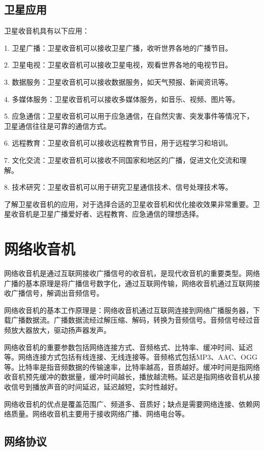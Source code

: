 \documentclass[12pt,UTF8]{ctexbook}
\begin{document}
\subsection{卫星应用}

卫星收音机具有以下应用：

1. 卫星广播：卫星收音机可以接收卫星广播，收听世界各地的广播节目。

2. 卫星电视：卫星收音机可以接收卫星电视，观看世界各地的电视节目。

3. 数据服务：卫星收音机可以接收数据服务，如天气预报、新闻资讯等。

4. 多媒体服务：卫星收音机可以接收多媒体服务，如音乐、视频、图片等。

5. 应急通信：卫星收音机可以用于应急通信，在自然灾害、突发事件等情况下，卫星通信往往是可靠的通信方式。

6. 远程教育：卫星收音机可以接收远程教育节目，用于远程学习和培训。

7. 文化交流：卫星收音机可以接收不同国家和地区的广播，促进文化交流和理解。

8. 技术研究：卫星收音机可以用于研究卫星通信技术、信号处理技术等。

了解卫星收音机的应用，对于选择合适的卫星收音机和优化接收效果非常重要。卫星收音机是卫星广播爱好者、远程教育、应急通信的理想选择。

\section{网络收音机}

网络收音机是通过互联网接收广播信号的收音机，是现代收音机的重要类型。网络广播的基本原理是将广播信号数字化，通过互联网传输，网络收音机通过互联网接收广播信号，解调出音频信号。

网络收音机的基本工作原理是：网络收音机通过互联网连接到网络广播服务器，下载广播数据流。广播数据流经过解压缩、解码，转换为音频信号。音频信号经过音频放大器放大，驱动扬声器发声。

网络收音机的重要参数包括网络连接方式、音频格式、比特率、缓冲时间、延迟等。网络连接方式包括有线连接、无线连接等。音频格式包括MP3、AAC、OGG等。比特率是指音频数据的传输速率，比特率越高，音质越好。缓冲时间是指网络收音机预先缓冲的数据量，缓冲时间越长，播放越流畅。延迟是指网络收音机从接收信号到播放声音的时间延迟，延迟越短，实时性越好。

网络收音机的优点是覆盖范围广、频道多、音质好；缺点是需要网络连接、依赖网络质量。网络收音机主要用于接收网络广播、网络电台等。

\subsection{网络协议}
\end{document}
